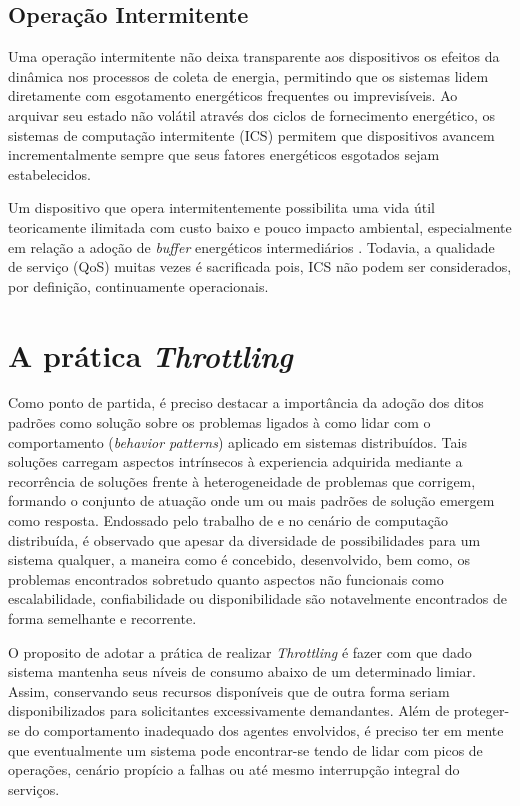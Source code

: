 \subsection{Operação Intermitente}
Uma operação intermitente não deixa transparente aos dispositivos os efeitos da dinâmica nos processos de coleta de energia, permitindo que os sistemas lidem diretamente com esgotamento energéticos frequentes ou imprevisíveis. Ao arquivar seu estado não volátil através dos ciclos de fornecimento energético, os sistemas de computação intermitente (\acl{ICS}) permitem que dispositivos avancem incrementalmente sempre que seus fatores energéticos esgotados sejam estabelecidos. 

Um dispositivo que opera intermitentemente possibilita uma vida útil teoricamente ilimitada com custo baixo e pouco impacto ambiental, especialmente em relação a adoção de \textit{buffer} energéticos intermediários \cite{sliper_energy-driven_2020}. Todavia, a qualidade de serviço (\acl{QoS}) muitas vezes é sacrificada pois, \acs{ICS} não podem ser considerados, por definição, continuamente operacionais.

\section{A prática \textit{Throttling}}
\label{cap2:throttling}

Como ponto de partida, é preciso destacar a importância da adoção dos ditos padrões como solução sobre os problemas ligados à como lidar com o comportamento (\textit{behavior patterns}) aplicado em sistemas distribuídos. Tais soluções carregam aspectos intrínsecos à experiencia adquirida mediante a recorrência de soluções frente à heterogeneidade de problemas que corrigem, formando o conjunto de atuação onde um ou mais padrões de solução emergem como resposta. Endossado pelo trabalho de  e no cenário de computação distribuída, é observado que apesar da diversidade de possibilidades para um sistema qualquer, a maneira como é concebido, desenvolvido, bem como, os problemas encontrados sobretudo quanto  aspectos não funcionais como escalabilidade, confiabilidade ou disponibilidade são notavelmente encontrados de forma semelhante e recorrente.

O proposito de adotar a prática de realizar \textit{Throttling} é fazer com que dado sistema mantenha seus níveis de consumo abaixo de um determinado limiar. Assim, conservando seus recursos disponíveis que de outra forma seriam disponibilizados para solicitantes excessivamente demandantes. Além de proteger-se do comportamento inadequado dos agentes envolvidos, é preciso ter em mente que eventualmente um sistema pode encontrar-se tendo de lidar com picos de operações, cenário propício a falhas ou até mesmo interrupção integral do serviços. 

